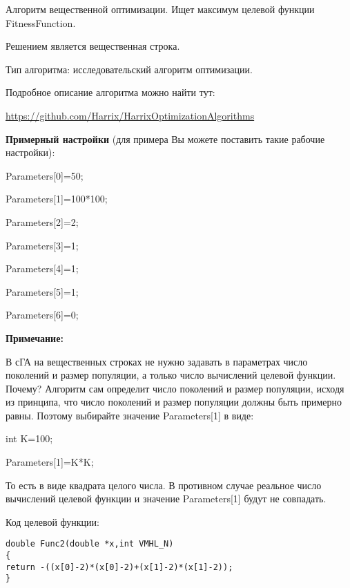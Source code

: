 \documentclass[a4paper,12pt]{article}
\begin{document}
Алгоритм вещественной оптимизации. Ищет максимум целевой функции FitnessFunction.

Решением является вещественная строка.

Тип алгоритма: исследовательский алгоритм оптимизации.

Подробное описание алгоритма можно найти тут:

\href{https://github.com/Harrix/HarrixOptimizationAlgorithms/blob/master/\_HarrixOptimizationAlgorithms.pdf}{https://github.com/Harrix/HarrixOptimizationAlgorithms}

\textbf{Примерный настройки} (для примера Вы можете поставить такие рабочие настройки):

 Parameters[0]=50;
 
Parameters[1]=100*100;

Parameters[2]=2;

Parameters[3]=1;

Parameters[4]=1;

Parameters[5]=1;

Parameters[6]=0;


\textbf{Примечание:}

 В сГА на вещественных строках не нужно задавать в параметрах число поколений и размер популяции, а только число вычислений целевой функции. Почему? Алгоритм сам определит число поколений и размер популяции, исходя из принципа, что число поколений и размер популяции должны быть примерно равны. Поэтому выбирайте значение Parameters[1] в виде:

int K=100;

Parameters[1]=K*K;

То есть в виде квадрата целого числа. В противном случае реальное число вычислений целевой функции и значение Parameters[1] будут не совпадать.

Код целевой функции:
\begin{lstlisting}[caption=Оптимизируемая функция]
double Func2(double *x,int VMHL_N)
{
return -((x[0]-2)*(x[0]-2)+(x[1]-2)*(x[1]-2));
}
\end{lstlisting}
\end{document}
